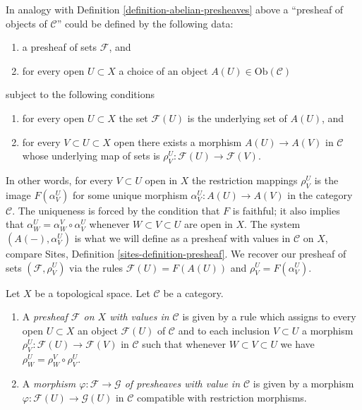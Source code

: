 \medskip\noindent
In analogy with Definition \ref{definition-abelian-presheaves}
above a ``presheaf of objects of $\mathcal{C}$'' could be
defined by the following data:
\begin{enumerate}
\item a presheaf of sets $\mathcal{F}$, and
\item for every open $U \subset X$ a choice
of an object $A(U) \in \text{Ob}(\mathcal{C})$
\end{enumerate}
subject to the following conditions
\begin{enumerate}
\item for every open $U \subset X$ the set $\mathcal{F}(U)$
is the underlying set of $A(U)$, and
\item for every $V \subset U \subset X$ open
there exists a morphism $A(U) \to A(V)$ in $\mathcal{C}$
whose underlying map of sets is $\rho_V^U: \mathcal{F}(U) \to \mathcal{F}(V)$.
\end{enumerate}
In other words, for every $V \subset U$ open in $X$ 
the restriction mappings $\rho^U_V$ is the image
$F(\alpha^U_V)$ for some unique morphism
$\alpha^U_V : A(U) \to A(V)$ in the category $\mathcal{C}$.
The uniqueness is forced by the condition that $F$ is
faithful; it also implies that
$\alpha^U_W = \alpha^V_W \circ \alpha^U_V$
whenever $W \subset V \subset U$ are open in $X$.
The system $(A(-), \alpha^U_V)$ is what we will define as a
presheaf with values in $\mathcal{C}$ on $X$, compare
Sites, Definition \ref{sites-definition-presheaf}.
We recover our presheaf of sets $(\mathcal{F}, \rho_V^U)$
via the rules $\mathcal{F}(U) = F(A(U))$ and
$\rho_V^U = F(\alpha_V^U)$.

\begin{definition}
\label{definition-prefsheaf-values-in-category}
Let $X$ be a topological space.
Let $\mathcal{C}$ be a category.
\begin{enumerate}
\item A {\it presheaf $\mathcal{F}$ on $X$ with values in $\mathcal{C}$}
is given by a rule which assigns to every open $U \subset X$
an object $\mathcal{F}(U)$ of $\mathcal{C}$
and to each inclusion $V \subset U$
a morphism $\rho_V^U : \mathcal{F}(U) \to \mathcal{F}(V)$
in $\mathcal{C}$ such that whenever $W \subset V \subset U$
we have $\rho_W^U = \rho_W^V \circ \rho_V^U$.
\item A {\it morphism $\varphi : \mathcal{F} \to \mathcal{G}$
of presheaves with value in $\mathcal{C}$} is given by a
morphism $\varphi : \mathcal{F}(U) \to \mathcal{G}(U)$
in $\mathcal{C}$ compatible with restriction morphisms.
\end{enumerate}
\end{definition}

